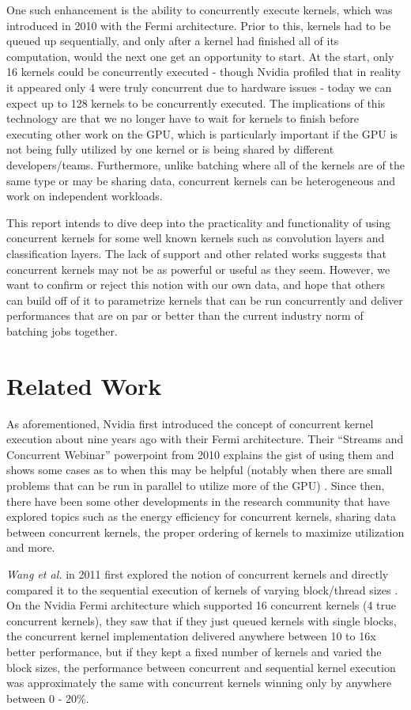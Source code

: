\documentclass[sigconf]{acmart}
\begin{document}
One such enhancement is the ability to concurrently execute kernels, which was introduced in 2010 with the Fermi architecture. Prior to this, kernels had to be queued up sequentially, and only after a kernel had finished all of its computation, would the next one get an opportunity to start. At the start, only 16 kernels could be concurrently executed - though Nvidia profiled that in reality it appeared only 4 were truly concurrent due to hardware issues - today we can expect up to 128 kernels to be concurrently executed. The implications of this technology are that we no longer have to wait for kernels to finish before executing other work on the GPU, which is particularly important if the GPU is not being fully utilized by one kernel or is being shared by different developers/teams. Furthermore, unlike batching where all of the kernels are of the same type or may be sharing data, concurrent kernels can be heterogeneous and work on independent workloads. 

This report intends to dive deep into the practicality and functionality of using concurrent kernels for some well known kernels such as convolution layers and classification layers. The lack of support and other related works suggests that concurrent kernels may not be as powerful or useful as they seem. However, we want to confirm or reject this notion with our own data, and hope that others can build off of it to parametrize kernels that can be run concurrently and deliver performances that are on par or better than the current industry norm of batching jobs together.  


\section{Related Work}
As aforementioned, Nvidia first introduced the concept of concurrent kernel execution about nine years ago with their Fermi architecture. Their “Streams and Concurrent Webinar” powerpoint from 2010 explains the gist of using them and shows some cases as to when this may be helpful (notably when there are small problems that can be run in parallel to utilize more of the GPU) \cite{nvidia_concurrent}. Since then, there have been some other developments in the research community that have explored topics such as the energy efficiency for concurrent kernels, sharing data between concurrent kernels, the proper ordering of kernels to maximize utilization and more. 

\textit{Wang et al.} in 2011 first explored the notion of concurrent kernels and directly compared it to the sequential execution of kernels of varying block/thread sizes \cite{wang_huang_el_ghazawi_2011}. On the Nvidia Fermi architecture which supported 16 concurrent kernels (4 true concurrent kernels), they saw that if they just queued kernels with single blocks, the concurrent kernel implementation delivered anywhere between 10 to 16x better performance, but if they kept a fixed number of kernels and varied the block sizes, the performance between concurrent and sequential kernel execution was approximately the same with concurrent kernels winning only by anywhere between 0 - 20\%.
\end{document}

